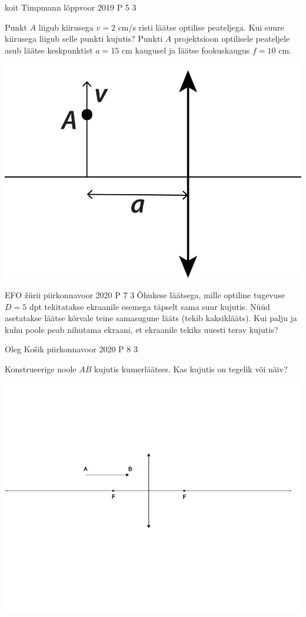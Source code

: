 \documentclass[11pt]{article}
\begin{document}
{%
{koit Timpmann} %
{lõppvoor} %
{2019} %
{P 5} %
{3} %
{
\ifStatement
Punkt $A$ liigub kiirusega $v = 2$ cm/s risti läätse optilise peateljega. Kui suure kiirusega liigub selle punkti kujutis? Punkti $A$ projektsioon optilisele peateljele asub läätse keskpunktist $a = 15$ cm kaugusel ja läätse fookuskaugus $f = 10$ cm.
\begin{center}
	\includegraphics[width=0.5\linewidth]{2019-v3p-05-yl.PNG}
\end{center}
\fi
}

{EFO žürii} %
{piirkonnavoor} %
{2020} %
{P 7} %
{3} %
{
\ifStatement
Õhukese läätsega, mille optiline tugevuse $D = 5$ dpt tekitatakse ekraanile esemega täpselt sama suur kujutis. Nüüd asetatakse läätse kõrvale teine samasugune lääts (tekib kaksiklääts). Kui palju ja kuhu poole peab nihutama ekraani, et ekraanile tekiks uuesti terav kujutis?
\fi
}

{Oleg Košik} %
{piirkonnavoor} %
{2020} %
{P 8} %
{3} %
{
\ifStatement
Konstrueerige noole $AB$ kujutis kumerläätses. Kas kujutis on tegelik või näiv?
\begin{center}
	\includegraphics[width=0.5\linewidth]{2020-v2p-08-yl.PNG}
\end{center}
\fi
}


}
\end{document}
